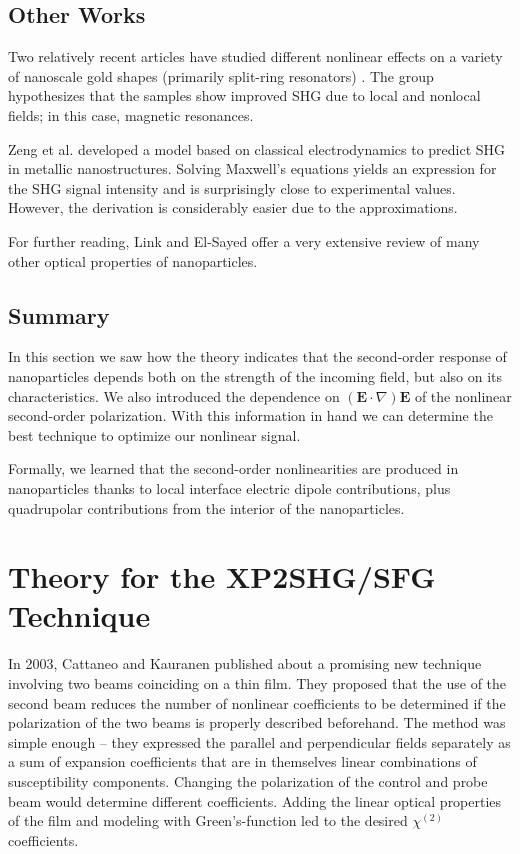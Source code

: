 \documentclass[10pt]{article}
\begin{document}
\subsection{Other Works}
Two relatively recent articles have studied different nonlinear effects on a variety of nanoscale gold shapes (primarily split-ring resonators) \cite{klein2007experiments, feth2008second}. The group hypothesizes that the samples show improved SHG due to local and nonlocal fields; in this case, magnetic resonances.

Zeng et al. \cite{zeng2009classical} developed a model based on classical electrodynamics to predict SHG in metallic nanostructures. Solving Maxwell's equations yields an expression for the SHG signal intensity and is surprisingly close to experimental values. However, the derivation is considerably easier due to the approximations.

For further reading, Link and El-Sayed \cite{link2003optical} offer a very extensive review of many other optical properties of nanoparticles.

\subsection{Summary}
In this section we saw how the theory indicates that the second-order response of nanoparticles depends both on the strength of the incoming field, but also on its characteristics. We also introduced the dependence on $\left(\mathbf{E}\cdot\nabla\right)\mathbf{E}$ of the nonlinear second-order polarization. With this information in hand we can determine the best technique to optimize our nonlinear signal.

Formally, we learned that the second-order nonlinearities are produced in nanoparticles thanks to local interface electric dipole contributions, plus quadrupolar contributions from the interior of the nanoparticles.

\section{Theory for the XP2SHG/SFG Technique}\label{chap_theory_xp2}
In 2003, Cattaneo and Kauranen \cite{cattaneo2003determination} published about a promising new technique involving two beams coinciding on a thin film. They proposed that the use of the second beam reduces the number of nonlinear coefficients to be determined if the polarization of the two beams is properly described beforehand. The method was simple enough -- they expressed the parallel and perpendicular fields separately as a sum of expansion coefficients that are in themselves linear combinations of susceptibility components. Changing the polarization of the control and probe beam would determine different coefficients. Adding the linear optical properties of the film and modeling with Green's-function led to the desired $\chi^{(2)}$ coefficients.
\end{document}
